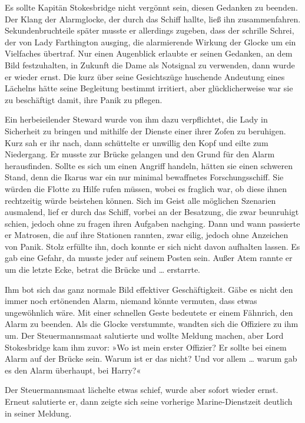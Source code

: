 \bigpar

Es sollte Kapitän Stokesbridge nicht vergönnt sein, diesen Gedanken
zu beenden. Der Klang der Alarmglocke, der durch das Schiff hallte,
ließ ihn zusammenfahren. Sekundenbruchteile später musste er
allerdings zugeben, dass der schrille Schrei, der von Lady
Farthington ausging, die alarmierende Wirkung der Glocke um ein
Vielfaches übertraf. Nur einen Augenblick erlaubte er seinen
Gedanken, an dem Bild festzuhalten, in Zukunft die Dame als
Notsignal zu verwenden, dann wurde er wieder ernst. Die kurz über
seine Gesichtszüge huschende Andeutung eines Lächelns hätte seine
Begleitung bestimmt irritiert, aber glücklicherweise war sie zu
beschäftigt damit, ihre Panik zu pflegen.

Ein herbeieilender Steward wurde von ihm dazu verpflichtet, die
Lady in Sicherheit zu bringen und mithilfe der Dienste einer ihrer
Zofen zu beruhigen. Kurz sah er ihr nach, dann schüttelte er
unwillig den Kopf und eilte zum Niedergang. Er musste zur Brücke
gelangen und den Grund für den Alarm herausfinden. Sollte es sich
um einen Angriff handeln, hätten sie einen schweren Stand, denn die
Ikarus war ein nur minimal bewaffnetes Forschungsschiff. Sie würden
die Flotte zu Hilfe rufen müssen, wobei es fraglich war, ob diese
ihnen rechtzeitig würde beistehen können. Sich im Geist alle
möglichen Szenarien ausmalend, lief er durch das Schiff, vorbei an
der Besatzung, die zwar beunruhigt schien, jedoch ohne zu fragen
ihren Aufgaben nachging. Dann und wann passierte er Matrosen, die
auf ihre Stationen rannten, zwar eilig, jedoch ohne Anzeichen von
Panik. Stolz erfüllte ihn, doch konnte er sich nicht davon
aufhalten lassen. Es gab eine Gefahr, da musste jeder auf seinem
Posten sein. Außer Atem rannte er um die letzte Ecke, betrat die
Brücke und \ldots{} erstarrte.

Ihm bot sich das ganz normale Bild effektiver Geschäftigkeit. Gäbe
es nicht den immer noch ertönenden Alarm, niemand könnte vermuten,
dass etwas ungewöhnlich wäre. Mit einer schnellen Geste bedeutete
er einem Fähnrich, den Alarm zu beenden. Als die Glocke verstummte,
wandten sich die Offiziere zu ihm um. Der Steuermannsmaat
salutierte und wollte Meldung machen, aber Lord Stokesbridge kam
ihm zuvor: »Wo ist mein erster Offizier? Er sollte bei einem Alarm
auf der Brücke sein. Warum ist er das nicht? Und vor allem \ldots{}
warum gab es den Alarm überhaupt, bei Harry?«

Der Steuermannsmaat lächelte etwas schief, wurde aber sofort wieder
ernst. Erneut salutierte er, dann zeigte sich seine vorherige
Marine-Dienstzeit deutlich in seiner Meldung.


